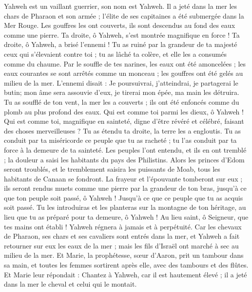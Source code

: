 \begin{multicols}{2}
Yahweh est un vaillant guerrier, son nom est Yahweh.
Il a jeté dans la mer les chars de Pharaon et son armée ; l’élite de ses capitaines a été submergée dans la Mer Rouge.
Les gouffres les ont couverts, ils sont descendus au fond des eaux comme une pierre.
Ta droite, ô Yahweh, s'est montrée magnifique en force ! Ta droite, ô Yahweh, a brisé l'ennemi !
Tu as ruiné par la grandeur de ta majesté ceux qui s'élevaient contre toi ; tu as lâché ta colère, et elle les a consumés comme du chaume.
Par le souffle de tes narines, les eaux ont été amoncelées ; les eaux courantes se sont arrêtés comme un monceau ; les gouffres ont été gelés au milieu de la mer.
L'ennemi disait : Je poursuivrai, j'atteindrai, je partagerai le butin; mon âme sera assouvie d'eux, je tirerai mon épée, ma main les détruira.
Tu as soufflé de ton vent, la mer les a couverts ; ils ont été  enfoncés comme du plomb au plus profond des eaux.
Qui est comme toi parmi les dieux, ô Yahweh ! Qui est comme toi, magnifique en sainteté, digne d'être révéré et célébré, faisant des choses merveilleuses ?
Tu as étendu ta droite, la terre les a engloutis.
Tu as conduit par ta miséricorde ce peuple que tu as racheté ; tu l'as conduit par ta force à la demeure de ta sainteté.
Les peuples l'ont entendu, et ils en ont tremblé ; la douleur a saisi les habitants du pays des Philistins.
Alors les princes d'Edom seront troublés, et le tremblement saisira les puissants de Moab, tous les habitants de Canaan se fondront.
La frayeur et l'épouvante tomberont sur eux ; ils seront rendus muets comme une pierre par la grandeur de ton bras, jusqu'à ce que ton peuple soit passé, ô Yahweh ! Jusqu'à ce que ce peuple que tu as acquis soit passé.
Tu les introduiras et les planteras sur la montagne de ton héritage, au lieu que tu as préparé pour ta demeure, ô Yahweh ! Au lieu saint, ô Seigneur, que tes mains ont établi !
Yahweh régnera à jamais et à perpétuité.
Car les chevaux de Pharaon, ses chars et ses cavaliers sont entrés dans la mer, et Yahweh a fait retourner sur eux les eaux de la mer ; mais les fils d'Israël ont marché à sec au milieu de la mer.
 Et Marie, la prophétesse, sœur d'Aaron, prit un tambour dans sa main, et toutes les femmes sortirent après elle, avec des tambours et des flûtes.
Et Marie leur répondait : Chantez à Yahweh, car il est hautement élevé ; il a jeté dans la mer le cheval et celui qui le montait.

\end{multicols}
